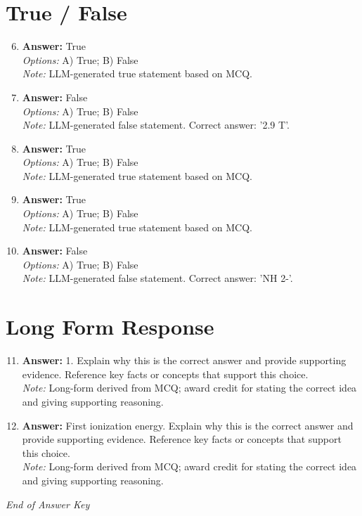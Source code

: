 \documentclass[12pt]{article}
\begin{document}
\section*{True / False}
\begin{enumerate}[label=\arabic*.]
\setcounter{enumi}{5}
\item \textbf{Answer:} True
\\ \textit{Options:} A) True; B) False
\\ \textit{Note:} LLM-generated true statement based on MCQ.
\item \textbf{Answer:} False
\\ \textit{Options:} A) True; B) False
\\ \textit{Note:} LLM-generated false statement. Correct answer: '2.9 T'.
\item \textbf{Answer:} True
\\ \textit{Options:} A) True; B) False
\\ \textit{Note:} LLM-generated true statement based on MCQ.
\item \textbf{Answer:} True
\\ \textit{Options:} A) True; B) False
\\ \textit{Note:} LLM-generated true statement based on MCQ.
\item \textbf{Answer:} False
\\ \textit{Options:} A) True; B) False
\\ \textit{Note:} LLM-generated false statement. Correct answer: 'NH 2-'.
\end{enumerate}

\section*{Long Form Response}
\begin{enumerate}[label=\arabic*.]
\setcounter{enumi}{10}
\item \textbf{Answer:} 1. Explain why this is the correct answer and provide supporting evidence. Reference key facts or concepts that support this choice.
\\ \textit{Note:} Long-form derived from MCQ; award credit for stating the correct idea and giving supporting reasoning.
\item \textbf{Answer:} First ionization energy. Explain why this is the correct answer and provide supporting evidence. Reference key facts or concepts that support this choice.
\\ \textit{Note:} Long-form derived from MCQ; award credit for stating the correct idea and giving supporting reasoning.
\end{enumerate}

\vfill
\noindent\textit{End of Answer Key}
\end{document}
